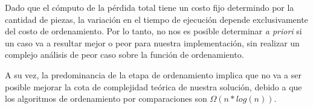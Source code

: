 Dado que el cómputo de la pérdida total tiene un costo fijo determindo por la cantidad de piezas, la variación en el tiempo de ejecución depende exclusivamente del costo de ordenamiento. Por lo tanto, no nos es posible determinar \emph{a priori} si un caso va a resultar mejor o peor para nuestra implementación, sin realizar un complejo análisis de peor caso sobre la función de ordenamiento.

A su vez, la predominancia de la etapa de ordenamiento implica que no va a ser posible mejorar la cota de complejidad teórica de nuestra solución, debido a que los algoritmos de ordenamiento por comparaciones son $\Omega(n * log(n))$.